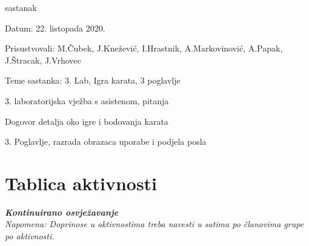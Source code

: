 \begin{packed_enum}
			\item  sastanak
			\item[] \begin{packed_item}
				\item Datum: 22. listopada 2020.
				\item Prisustvovali: M.Čubek, J.Knežević, I.Hrastnik, A.Markovinović, A.Papak, J.Štracak, J.Vrhovec
				\item Teme sastanka: 3. Lab, Igra karata, 3 poglavlje
				\begin{packed_item}
					\item 3. laboratorijska vježba s asistenom, pitanja
					\item Dogovor detalja oko igre i bodovanja karata
					\item 3. Poglavlje, razrada obrazaca uporabe i podjela posla
				\end{packed_item}
			\end{packed_item}
				
			
		\end{packed_enum}
		
		\eject
		\section*{Tablica aktivnosti}
		
			\textbf{\textit{Kontinuirano osvježavanje}}\\
			
			 \textit{Napomena: Doprinose u aktivnostima treba navesti u satima po članovima grupe po aktivnosti.}
					
						
			
